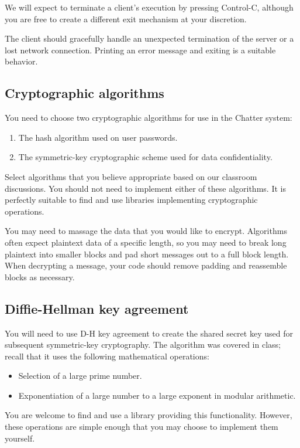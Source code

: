 \documentclass[letterpaper]{article}
\begin{document}
We will expect to terminate a client's execution by pressing Control-C, although you
are free to create a different exit mechanism at your discretion.

The client should gracefully handle an unexpected termination of the server or a lost
network connection. Printing an error message and exiting is a suitable behavior.

\subsection*{Cryptographic algorithms}

You need to choose two cryptographic algorithms for use in the Chatter system:
\begin{enumerate}
\item The hash algorithm used on user passwords.
\item The symmetric-key cryptographic scheme used for data confidentiality.
\end{enumerate}
Select algorithms that you believe appropriate based on our classroom discussions.
You should not need to implement either of these algorithms. It is perfectly suitable
to find and use libraries implementing cryptographic operations.

You may need to massage the data that you would like to encrypt. Algorithms often
expect plaintext data of a specific length, so you may need to break long plaintext
into smaller blocks and pad short messages out to a full block length. When
decrypting a message, your code should remove padding and reassemble blocks as
necessary.

\subsection*{Diffie-Hellman key agreement}

You will need to use D-H key agreement to create the shared secret key used for
subsequent symmetric-key cryptography. The algorithm was covered in class; recall
that it uses the following mathematical operations:
\begin{itemize}
\item Selection of a large prime number.
\item Exponentiation of a large number to a large exponent in modular arithmetic.
\end{itemize}
You are welcome to find and use a library providing this functionality. However,
these operations are simple enough that you may choose to implement them
yourself.
\end{document}
